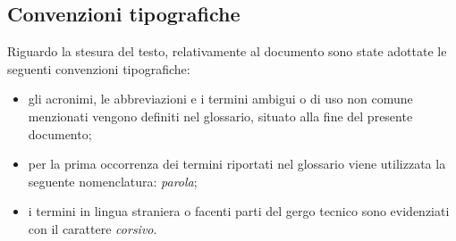 \subsection{Convenzioni tipografiche}
Riguardo la stesura del testo, relativamente al documento sono state adottate le seguenti convenzioni tipografiche:
\begin{itemize}
	\item gli acronimi, le abbreviazioni e i termini ambigui o di uso non comune menzionati vengono definiti nel glossario, situato alla fine del presente documento;
	\item per la prima occorrenza dei termini riportati nel glossario viene utilizzata la seguente nomenclatura: \emph{parola}\glsfirstoccur;
	\item i termini in lingua straniera o facenti parti del gergo tecnico sono evidenziati con il carattere \emph{corsivo}.
\end{itemize}